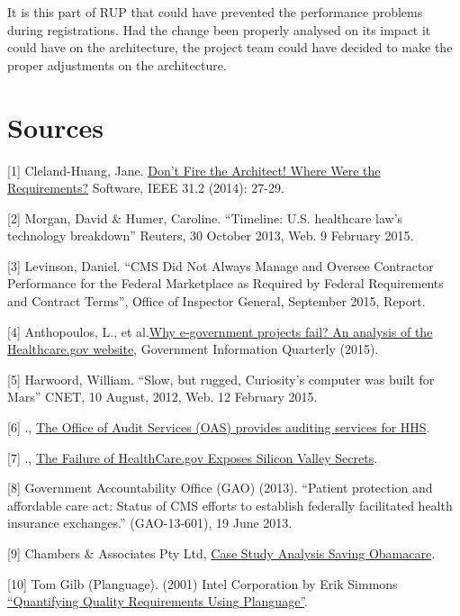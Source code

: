 \documentclass[]{article}
\begin{document}
It is this part of RUP that could have prevented the performance
problems during registrations. Had the change been properly analysed on
its impact it could have on the architecture, the project team could
have decided to make the proper adjustments on the architecture.

\section{Sources}\label{sources}

{[}1{]} Cleland-Huang, Jane.
\href{http://ieeexplore.ieee.org/stamp/stamp.jsp?tp=\&arnumber=6774318}{Don't
Fire the Architect! Where Were the Requirements?} Software, IEEE 31.2
(2014): 27-29.

{[}2{]} Morgan, David \& Humer, Caroline. ``Timeline: U.S. healthcare
law's technology breakdown'' Reuters, 30 October 2013, Web. 9 February
2015.

{[}3{]} Levinson, Daniel. ``CMS Did Not Always Manage and Oversee
Contractor Performance for the Federal Marketplace as Required by
Federal Requirements and Contract Terms'', Office of Inspector General,
September 2015, Report.

{[}4{]} Anthopoulos, L., et
al.\href{http://www.sciencedirect.com/science/article/pii/S0740624X15000799}{Why
e-government projects fail? An analysis of the Healthcare.gov website},
Government Information Quarterly (2015).

{[}5{]} Harwoord, William. ``Slow, but rugged, Curiosity's computer was
built for Mars'' CNET, 10 August, 2012, Web. 12 February 2015.

{[}6{]} .,
\href{http://oig.hhs.gov/oas/reports/region3/31403001.pdf}{The Office of
Audit Services (OAS) provides auditing services for HHS}.

{[}7{]} .,
\href{http://www.computer.org/csdl/mags/ic/2014/06/mic2014060085.pdf}{The
Failure of HealthCare.gov Exposes Silicon Valley Secrets}.

{[}8{]} Government Accountability Office (GAO) (2013). ``Patient
protection and affordable care act: Status of CMS efforts to establish
federally facilitated health insurance exchanges.'' (GAO-13-601), 19
June 2013.

{[}9{]} Chambers \& Associates Pty Ltd,
\href{http://www.chambers.com.au/public_resources/case_study/obamacare/saving-obamacare-case-study-analysis.pdf}{Case
Study Analysis Saving Obamacare}.

{[}10{]} Tom Gilb (Planguage). (2001) Intel Corporation by Erik Simmons
\href{http://www.clearspecs.com/downloads/ClearSpecs20V01_Quantifying\%20Quality\%20Requirements.pdf}{``Quantifying
Quality Requirements Using Planguage''}.
\end{document}
